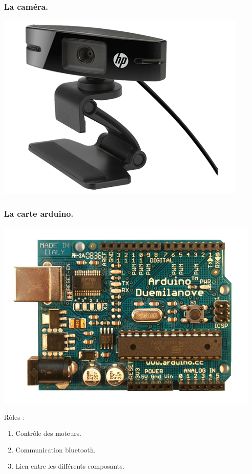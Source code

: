 \begin{frame}
    \frametitle{La caméra.}
    \begin{center}
        \includegraphics[scale=0.25]{rcs/cam.png}
    \end{center}
\end{frame}

\begin{frame}
    \frametitle{La carte arduino.}
    \begin{center}
        \includegraphics[scale=.15]{rcs/ardui.png}
    \end{center}
     {
        Rôles : \begin{enumerate}
            \pause \item Contrôle des moteurs.
            \pause \item Communication bluetooth.
            \pause \item Lien entre les différents composants.
        \end{enumerate}
    }
\end{frame}

